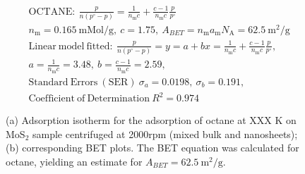 

\begin{align*}
&\mathrm{OCTANE:}\ \frac{p}{n(p^\circ-p)}=\frac{1}{n_\mathrm{m}c}+\frac{c-1}{n_\mathrm{m}c}\frac{p}{p^\circ}\\
&{n_\mathrm{m}}=0.165\ \mathrm{mMol/g},\ c=1.75,\ A_{BET}={n_\mathrm{m}}{a_\mathrm{m}}{N_\mathrm{A}}=62.5\ \mathrm{m}^2\mathrm{/g}\\
&\mathrm{Linear\ model\ fitted:}\ \frac{p}{n(p^\circ-p)}=y=a+bx=\frac{1}{n_\mathrm{m}c}+\frac{c-1}{n_\mathrm{m}c}\frac{p}{p^\circ},\\
&a=\frac{1}{n_\mathrm{m}c}=3.48,\ b=\frac{c-1}{n_\mathrm{m}c}=2.59,\\
&\mathrm{Standard\ Errors\ (SER)}\ \sigma_a=0.0198,\ \sigma_b=0.191,\\
&\mathrm{Coefficient\ of\ Determination}\ R^2 = 0.974
\end{align*}


\begin{figure}[htb]
\hfill
{}
\caption{(a) Adsorption isotherm for the adsorption of octane at XXX K on MoS$_2$ 
sample centrifuged at 2000rpm (mixed bulk and nanosheets);
(b) corresponding BET plots. The BET equation was calculated for octane, yielding an estimate for $A_{BET}=62.5\ \mathrm{m}^2\mathrm{/g}$.}

\label{fig:sa-Reference-As-Supplied-5mg-3mm-30C-S1-SA-10ml}
\end{figure}


